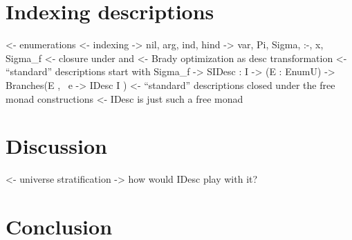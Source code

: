 \documentclass[preprint, authoryear]{sigplanconf}
\newenvironment{structure}{\footnotesize\verbatim}{\endverbatim}
\begin{document}
\section{Indexing descriptions}


\begin{structure}
<- enumerations
<- indexing
    -> nil, arg, ind, hind
    -> var, Pi, Sigma, :-, x, Sigma_f
<- closure under \box and \diamond
<- Brady optimization as desc transformation
<- ``standard'' descriptions start with Sigma_f
    -> SIDesc : I -> (E : EnumU) -> Branches(E , \ e -> IDesc I )
<- ``standard'' descriptions closed under the free monad constructions
<- IDesc is just such a free monad
\end{structure}


\section{Discussion}

\begin{structure}
<- universe stratification
    -> how would IDesc play with it?
\end{structure}



\section{Conclusion}

\begin{structure}
\end{structure}















\end{document}
